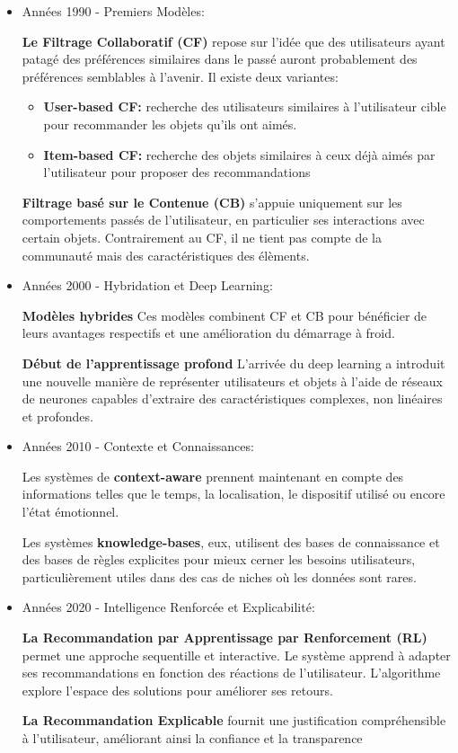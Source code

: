 \documentclass{article}
\begin{document}
\begin{itemize}
    \item Années 1990 - Premiers Modèles:

          \textbf{Le Filtrage Collaboratif (CF)} repose sur l'idée que des utilisateurs ayant patagé des préférences similaires dans le passé auront probablement des préférences semblables à l'avenir. Il existe deux variantes:
          \begin{itemize}
              \item \textbf{User-based CF: }recherche des utilisateurs similaires à l'utilisateur cible pour recommander les objets qu'ils ont aimés.
              \item \textbf{Item-based CF: }recherche des objets similaires à ceux déjà aimés par l'utilisateur pour proposer des recommandations
          \end{itemize}
          \textbf{Filtrage basé sur le Contenue (CB)} s'appuie uniquement sur les comportements passés de l'utilisateur, en particulier ses interactions avec certain objets. Contrairement au CF, il ne tient pas compte de la communauté mais des caractéristiques des élèments.
          \newline

    \item Années 2000 - Hybridation et Deep Learning:

          \textbf{Modèles hybrides} Ces modèles combinent CF et CB pour bénéficier de leurs avantages respectifs et une amélioration du démarrage à froid.

          \textbf{Début de l'apprentissage profond} L'arrivée du deep learning a introduit une nouvelle manière de représenter utilisateurs et objets à l'aide de réseaux de neurones capables d'extraire des caractéristiques complexes, non linéaires et profondes.
          \newline
    \item Années 2010 - Contexte et Connaissances:

          Les systèmes de \textbf{context-aware} prennent maintenant en compte des informations telles que le temps, la localisation, le dispositif utilisé ou encore l'état émotionnel.

          Les systèmes \textbf{knowledge-bases}, eux, utilisent des bases de connaissance et des bases de règles explicites pour mieux cerner les besoins utilisateurs, particulièrement utiles dans des cas de niches où les données sont rares.
          \newline
    \item Années 2020 - Intelligence Renforcée et Explicabilité:

          \textbf{La Recommandation par Apprentissage par Renforcement (RL)} permet une approche sequentille et interactive. Le système apprend à adapter ses recommandations en fonction des réactions de l'utilisateur. L'algorithme explore l'espace des solutions pour améliorer ses retours.

          \textbf{La Recommandation Explicable} fournit une justification compréhensible à l'utilisateur, améliorant ainsi la confiance et la transparence
\end{itemize}
\end{document}

